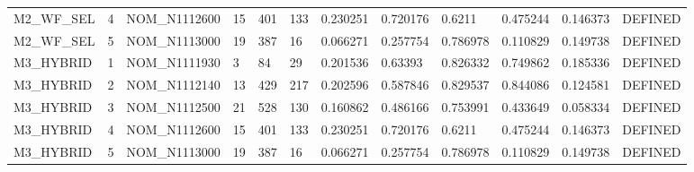 \begin{table}[ht]
\begin{tabular}{llllllllllll}
M2\_WF\_SEL & 4 & NOM\_N1112600 & 15 & 401 & 133 & 0.230251 & 0.720176 & 0.6211 & 0.475244 & 0.146373 & DEFINED \\
M2\_WF\_SEL & 5 & NOM\_N1113000 & 19 & 387 & 16 & 0.066271 & 0.257754 & 0.786978 & 0.110829 & 0.149738 & DEFINED \\
M3\_HYBRID & 1 & NOM\_N1111930 & 3 & 84 & 29 & 0.201536 & 0.63393 & 0.826332 & 0.749862 & 0.185336 & DEFINED \\
M3\_HYBRID & 2 & NOM\_N1112140 & 13 & 429 & 217 & 0.202596 & 0.587846 & 0.829537 & 0.844086 & 0.124581 & DEFINED \\
M3\_HYBRID & 3 & NOM\_N1112500 & 21 & 528 & 130 & 0.160862 & 0.486166 & 0.753991 & 0.433649 & 0.058334 & DEFINED \\
M3\_HYBRID & 4 & NOM\_N1112600 & 15 & 401 & 133 & 0.230251 & 0.720176 & 0.6211 & 0.475244 & 0.146373 & DEFINED \\
M3\_HYBRID & 5 & NOM\_N1113000 & 19 & 387 & 16 & 0.066271 & 0.257754 & 0.786978 & 0.110829 & 0.149738 & DEFINED \\
\bottomrule
\end{tabular}
\end{table}
